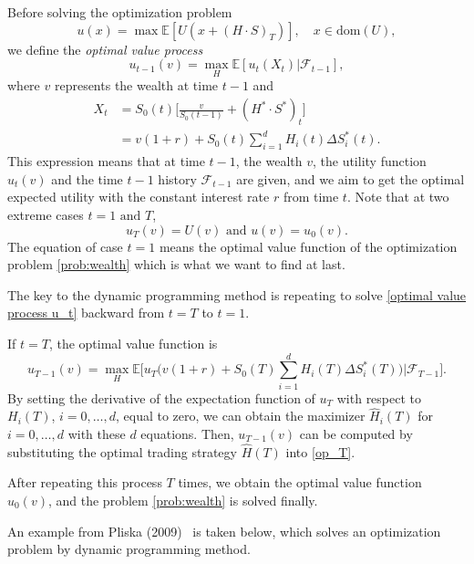 \documentclass[a4paper]{article}
\theoremstyle{definition}
\numberwithin{equation}{section}
\begin{document}
Before solving the optimization problem
$$u(x)=\max\mathbb E[U(x+(H\cdot S)_T)],\quad x\in\text{dom}(U),$$
we define the \emph{optimal value process}
\begin{equation}\label{optimal value process u_t}
u_{t-1}(v)=\max_H\mathbb E[u_t(X_t)\lvert\mathcal F_{t-1}],
\end{equation}
where $v$ represents the wealth at time $t-1$ and
\begin{equation}\nonumber
\begin{aligned}
X_t&=S_0(t)\big[\frac{v}{S_0(t-1)}+(H^*\cdot S^*)_t\big]\\
&=v(1+r)+S_0(t)\sum^d_{i=1}H_i(t)\Delta S^*_i(t).
\end{aligned}
\end{equation}
This expression means that at time $t-1$, the wealth $v$, the utility function $u_t(v)$ and the time $t-1$ history $\mathcal F_{t-1}$ are given, and we aim to get the optimal expected utility with the constant interest rate $r$ from time $t$.
Note that at two extreme cases $t=1\text{ and }T$,
$$u_T(v)=U(v)\text{ and }u(v)=u_0(v).$$
The equation of case $t=1$ means the optimal value function of the optimization problem \eqref{prob:wealth} which is what we want to find at last.

The key to the dynamic programming method is repeating to solve \eqref{optimal value process u_t} backward from $t=T$ to $t=1$.

If $t=T$, the optimal value function is
\begin{equation}\label{op_T}
u_{T-1}(v)=\max_H\mathbb E\Big[u_T\big(v(1+r)+S_0(T)\sum^d_{i=1}H_i(T)\Delta S^*_i(T)\big)\Big\lvert\mathcal F_{T-1}\Big].
\end{equation}
By setting the derivative of the expectation function of $u_T$ with respect to $H_i(T)$, $i=0,\dots,d$, equal to zero, we can obtain the maximizer $\hat H_i(T)$ for $i=0,\dots,d$ with these $d$ equations.
Then, $u_{T-1}(v)$ can be computed by substituting the optimal trading strategy $\hat H(T)$ into \eqref{op_T}.

After repeating this process $T$ times, we obtain the optimal value function $u_0(v)$, and the problem \eqref{prob:wealth} is solved finally.

An example from Pliska (2009)~\cite{book2} is taken below, which solves an optimization problem by dynamic programming method.
\end{document}
